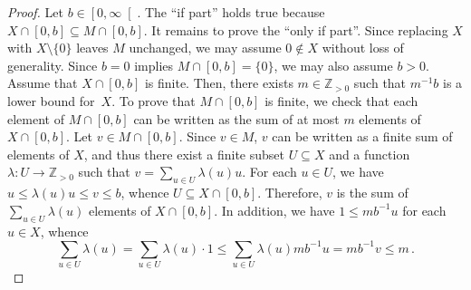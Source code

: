 \documentclass[12pt]{article}
\newcommand{\bZ}{\mathbb{Z}}
\newcommand{\bNast}{\bZ_{> 0}}
\newcommand{\bR}{\mathbb{R}}
\newcommand{\Rnneg}{\left[0, \infty\right[} %
\newtheorem{theorem}{Theorem}
\theoremstyle{definition}
\begin{document}
\begin{proof}
  Let $b \in \left[0, \infty \right[$.
  The ``if part'' holds true because $X \cap [0, b] \subseteq M \cap [0, b]$. 
  It remains to prove the ``only if part''.
  Since replacing $X$ with $X \setminus \{ 0 \}$ leaves $M$ unchanged,
  we may assume $0 \notin X$ without loss of generality.
  Since $b = 0$ implies $M \cap [0, b] = \{ 0 \}$,
  we may also assume $b > 0$.
  Assume that $X \cap [0, b]$ is finite.
  Then, there exists $m \in \bNast$ such that $m^{-1} b$ is a lower bound for~$X$.
  To prove that $M \cap [0, b]$ is finite,
  we check that each element of $M \cap [0, b]$ can be written as the sum of at most $m$ elements of $X \cap [0, b]$.
  Let $v \in M \cap [0, b]$.
  Since $v \in M$, $v$ can be written as a finite sum of elements of $X$,
  and thus there exist
  a finite subset $U \subseteq X$ and
  a function $\lambda \colon U \to \bNast$ such that
  $v = \sum_{u \in U} \lambda(u) u$.
  For each $u \in U$, we have $u \le \lambda(u) u \le v \le b$,
  whence $U \subseteq X \cap [0, b]$.
  Therefore, $v$ is the sum of $\sum_{u \in U} \lambda(u)$ elements of $X \cap [0, b]$.
  In addition, we have $1 \le m b^{-1} u$ for each $u \in X$, whence  
  $$
  \sum_{u \in U} \lambda(u) =
  \sum_{u \in U} \lambda(u) \cdot 1
  \le  \sum_{u \in U} \lambda(u) m b^{- 1} u  = m b^{-1} v \le m \, . 
  $$
\end{proof}



  
\end{document}
